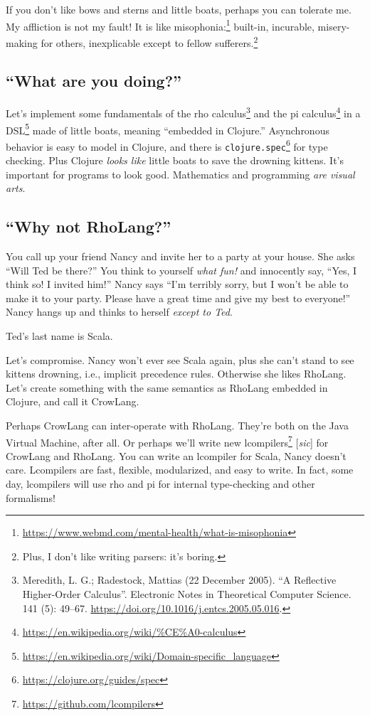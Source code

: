 \documentclass[10pt,oneside,x11names]{article}
\theoremstyle{definition}
\theoremstyle{warning}
\begin{document}
If you don't like bows and sterns and little boats, perhaps you can
tolerate me. My affliction is not my fault! It is like
misophonia:\footnote{\url{https://www.webmd.com/mental-health/what-is-misophonia}}
built-in, incurable, misery-making for others, inexplicable except to fellow
sufferers.\footnote{Plus, I don't like writing parsers: it's boring.}

\subsection{``What are you doing?''}
\label{sec:org583e7f6}

Let's implement some fundamentals of the rho calculus\footnote{Meredith, L. G.; Radestock, Mattias (22 December 2005). ``A Reflective Higher-Order Calculus''. Electronic Notes in Theoretical Computer Science. 141 (5): 49–67. \url{https://doi.org/10.1016/j.entcs.2005.05.016}.}
and the pi calculus\footnote{\url{https://en.wikipedia.org/wiki/\%CE\%A0-calculus}\label{orge48f4f0}}
in a DSL\footnote{\url{https://en.wikipedia.org/wiki/Domain-specific\_language}}
made of little boats, meaning ``embedded in Clojure.'' Asynchronous
behavior is easy to model in Clojure, and there is
\texttt{clojure.spec}\footnote{\url{https://clojure.org/guides/spec}} for type
checking. Plus Clojure \emph{looks like} little boats to save
the drowning kittens. It's important for programs to look good.
Mathematics and programming \emph{are visual arts}.

\subsection{``Why not RhoLang?''}
\label{sec:org2b4edb1}

You call up your friend Nancy and invite her to a party at your
house. She asks ``Will Ted be there?'' You think to yourself
\emph{what fun!} and innocently say, ``Yes, I think so! I invited him!''
Nancy says ``I'm terribly sorry, but I won't be able to make it to
your party. Please have a great time and give my best to
everyone!'' Nancy hangs up and thinks to herself \emph{except to Ted}.

Ted's last name is Scala.

Let's compromise. Nancy won't ever see Scala again, plus she can't
stand to see kittens drowning, i.e., implicit precedence rules.
Otherwise she likes RhoLang. Let's create something with the same
semantics as RhoLang embedded in Clojure, and call it CrowLang.

Perhaps CrowLang can inter-operate with RhoLang. They're both on
the Java Virtual Machine, after all. Or perhaps we'll write new
lcompilers\footnote{\url{https://github.com/lcompilers}\label{orgc4dbab2}} [\textit{sic}]
for CrowLang and RhoLang. You can write an lcompiler for Scala, Nancy
doesn't care. Lcompilers are fast, flexible, modularized, and
easy to write. In fact, some day, lcompilers will use rho and pi
for internal type-checking and other formalisms!
\end{document}
